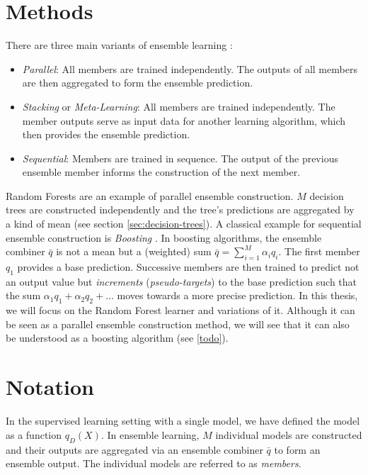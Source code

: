\documentclass[
    a4paper, %
	fontsize=10pt, %
	twoside=false, %
]{kaobook}
\begin{document}
\begin{titlepage}
\section{Methods}
\label{sec:ensemble-learning-methods}
There are three main variants of ensemble learning \cite{mienye_SurveyEnsembleLearning_2022}:
\begin{itemize}
\item \textit{Parallel}: All members are trained independently. The outputs of all members are then aggregated to form the ensemble prediction.
\item \textit{Stacking} or \textit{Meta-Learning}: All members are trained independently. The member outputs serve as input data for another learning algorithm, which then provides the ensemble prediction.
\item \textit{Sequential}: Members are trained in sequence. The output of the previous ensemble member informs the construction of the next member.
\end{itemize}
Random Forests \cite{breiman_RandomForests_2001} are an example of parallel ensemble construction. $M$ decision trees are constructed independently and the tree's predictions are aggregated by a kind of mean (see section \ref{sec:decision-trees}). A classical example for sequential ensemble construction is \textit{Boosting} \cite{schapire_BoostingFoundationsAlgorithms_2012}. In boosting algorithms, the ensemble combiner $\bar{q}$ is not a mean but a (weighted) sum $\bar{q} = \sum_{i=1}^M \alpha_{i}q_{i}$. The first member $q_{1}$ provides a base prediction. Successive members are then trained to predict not an output value but \textit{increments} (\textit{pseudo-targets}) to the base prediction such that the sum $\alpha_{1}q_{1} + \alpha_{2}q_{2} + \dots$ moves towards a more precise prediction. 
In this thesis, we will focus on the Random Forest learner and variations of it. Although it can be seen as a parallel ensemble construction method, we will see that it can also be understood as a boosting algorithm (see \ref{todo}).

\section{Notation}
\label{sec:ensemble-learning-notation}

In the supervised learning setting with a single model, we have defined the model as a function $q_{D}(X)$. In ensemble learning, $M$ individual models are constructed and their outputs are aggregated via an ensemble combiner $\bar{q}$ to form an ensemble output. The individual models are referred to as \textit{members}. 


\end{titlepage}
\end{document}
